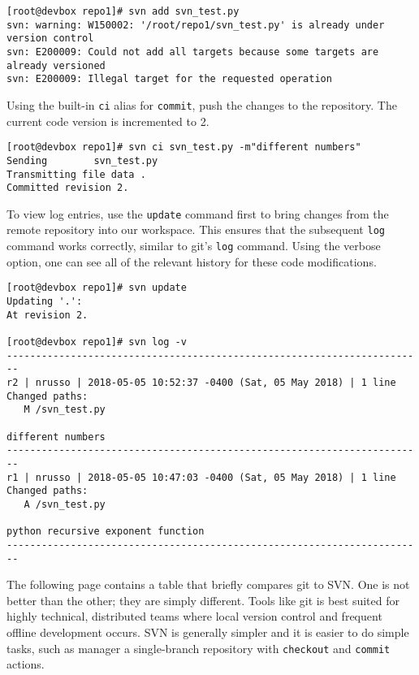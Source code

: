 \begin{verbatim}
[root@devbox repo1]# svn add svn_test.py
svn: warning: W150002: '/root/repo1/svn_test.py' is already under version control
svn: E200009: Could not add all targets because some targets are already versioned
svn: E200009: Illegal target for the requested operation
\end{verbatim}

Using the built-in \verb|ci| alias for \verb|commit|, push the changes to the
repository. The current code version is incremented to 2.

\begin{verbatim}
[root@devbox repo1]# svn ci svn_test.py -m"different numbers"
Sending        svn_test.py
Transmitting file data .
Committed revision 2.
 \end{verbatim}

To view log entries, use the \verb|update| command first to bring changes from
the remote repository into our workspace. This ensures that the subsequent
\verb|log| command works correctly, similar to git's \verb|log| command. Using
the verbose option, one can see all of the relevant history for these code
modifications.

\begin{verbatim}
[root@devbox repo1]# svn update
Updating '.':
At revision 2.

[root@devbox repo1]# svn log -v
------------------------------------------------------------------------
r2 | nrusso | 2018-05-05 10:52:37 -0400 (Sat, 05 May 2018) | 1 line
Changed paths:
   M /svn_test.py

different numbers
------------------------------------------------------------------------
r1 | nrusso | 2018-05-05 10:47:03 -0400 (Sat, 05 May 2018) | 1 line
Changed paths:
   A /svn_test.py

python recursive exponent function
------------------------------------------------------------------------
\end{verbatim}

The following page contains a table that briefly compares git to SVN. One is
not better than the other; they are simply different. Tools like git is best
suited for highly technical, distributed teams where local version control and
frequent offline development occurs. SVN is generally simpler and it is easier
to do simple tasks, such as manager a single-branch repository with
\verb|checkout| and \verb|commit| actions.


